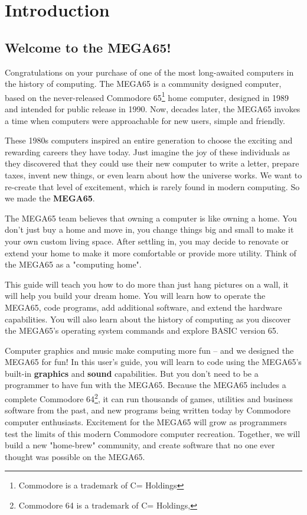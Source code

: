 \chapter{Introduction}

\section{Welcome to the MEGA65!}

Congratulations on your purchase of one of the most long-awaited computers in the history of computing. The MEGA65 is a community designed computer, based on the never-released Commodore{\textregistered} 65\footnote{Commodore is a trademark of C= Holdings} home computer, designed in 1989 and intended for public release in 1990. Now, decades later, the MEGA65 invokes a time when computers were approachable for new users, simple and friendly.

These 1980s computers inspired an entire generation to choose the exciting and rewarding careers they have today. Just imagine the joy of these individuals as they discovered that they could use their new computer to write a letter, prepare taxes, invent new things, or even learn about how the universe works. We want to re-create that level of excitement, which is rarely found in modern computing. So we made the {\bf MEGA65}.

The MEGA65 team believes that owning a computer is like owning a home. You don't just buy a home and move in, you change things big and small to make it your own custom living space. After settling in, you may decide to renovate or extend your home to make it more comfortable or provide more utility. Think of the MEGA65 as a "computing home".

This guide will teach you how to do more than just hang pictures on a wall, it will help you build your dream home. You will learn how to operate the MEGA65, code programs, add additional software, and extend the hardware capabilities. You will also learn about the history of computing as you discover the MEGA65's operating system commands and explore BASIC version 65.

Computer graphics and music make computing more fun -- and we designed the MEGA65 for fun! In this user's guide, you
will learn to code using the MEGA65's built-in {\bf graphics} and {\bf sound} capabilities. But you don't need to be
a programmer to have fun with the MEGA65. Because the MEGA65 includes a complete Commodore{\textregistered}
64{\texttrademark}\footnote{Commodore 64 is a trademark of C= Holdings,}, it can run thousands of games, utilities
and business software from the past, and new programs being written today by Commodore computer enthusiasts.
Excitement for the MEGA65 will grow as programmers test the limits of this modern Commodore computer recreation.
Together, we will build a new "home-brew" community, and create software that no one ever thought was possible on the MEGA65.

